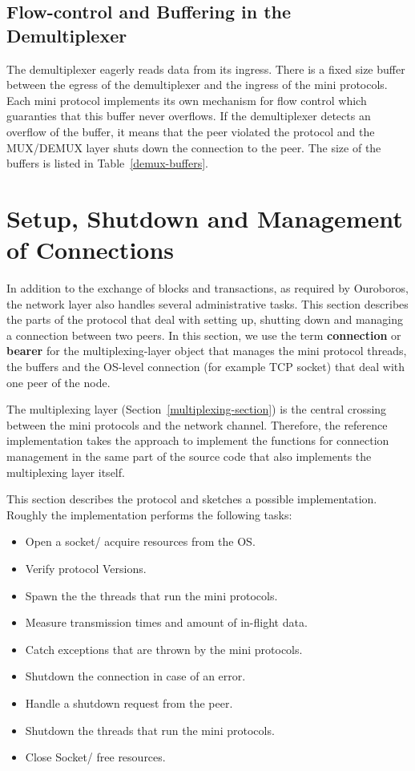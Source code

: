 \documentclass{report}
\theoremstyle{definition}{
  \newtheorem{lemma}{Lemma}[section] %
  \newtheorem{definition}[lemma]{Definition}
}
\theoremstyle{theorem}{
  \newtheorem{invariant}[lemma]{Invariant}
  \newtheorem{proofobligation}[lemma]{Proof Obligation}
}
\numberwithin{equation}{lemma}
\begin{document}
\subsection{Flow-control and Buffering in the Demultiplexer}
The demultiplexer eagerly reads data from its ingress.
There is a fixed size buffer between the egress of the demultiplexer and the ingress of
the mini protocols.
Each mini protocol implements its own mechanism for flow control which guaranties that this buffer
never overflows.
If the demultiplexer detects an overflow of the buffer, it means that the peer violated the
protocol and the MUX/DEMUX layer shuts down the connection to the peer.
The size of the buffers is listed in Table~\ref{demux-buffers}.

\section{Setup, Shutdown and Management of Connections}
\label{peer-setup-section}
In addition to the exchange of blocks and transactions, as required by Ouroboros,
the network layer also handles several administrative tasks.
This section describes the parts of the protocol that deal with setting up, shutting down and
managing a connection between two peers.
In this section, we use the term {\bf connection} or {\bf bearer} for the multiplexing-layer object
that manages the mini protocol threads, the buffers and the OS-level connection
(for example TCP socket) that deal with one peer of the node.

The multiplexing layer (Section~\ref{multiplexing-section}) is the central crossing between
the mini protocols and the network channel.
Therefore, the reference implementation takes the approach
to implement the functions for connection management in the same part of the source code
that also implements the multiplexing layer itself.

This section describes the protocol and sketches a possible implementation.
Roughly the implementation performs the following tasks:
\begin{itemize}
\item Open a socket/ acquire resources from the OS.
\item Verify protocol Versions.
\item Spawn the the threads that run the mini protocols.
\item Measure transmission times and amount of in-flight data.
\item Catch exceptions that are thrown by the mini protocols.
\item Shutdown the connection in case of an error.
\item Handle a shutdown request from the peer.
\item Shutdown the threads that run the mini protocols.
\item Close Socket/ free resources.
\end{itemize}
\end{document}
